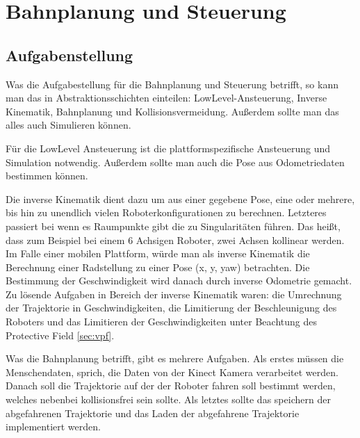\chapter{Bahnplanung und Steuerung}
\label{bahnplanung_steuerung_cha}

\section{Aufgabenstellung}
\label{bahnplanung_aufgabenstellung_sec}
\authorsection{\editoroier}


Was die Aufgabestellung für die Bahnplanung und Steuerung betrifft, so kann man das in Abstraktionsschichten einteilen:
LowLevel-Ansteuerung, Inverse Kinematik, Bahnplanung und Kollisionsvermeidung.
Außerdem sollte man das alles auch Simulieren können.

Für die LowLevel Ansteuerung ist die plattformspezifische Ansteuerung und Simulation notwendig. Außerdem sollte man auch die Pose aus Odometriedaten bestimmen können.

Die inverse Kinematik dient dazu um aus einer gegebene Pose, eine oder mehrere, bis hin zu unendlich vielen Roboterkonfigurationen zu berechnen. Letzteres passiert bei wenn es Raumpunkte gibt die zu Singularitäten führen. Das heißt,  dass zum Beispiel bei einem 6 Achsigen Roboter, zwei Achsen kollinear werden. Im Falle einer mobilen Plattform, würde man als inverse Kinematik die Berechnung einer Radstellung zu einer Pose (x, y, yaw) betrachten. Die Bestimmung der Geschwindigkeit wird danach durch inverse Odometrie gemacht. Zu lösende Aufgaben in Bereich der inverse Kinematik waren: die Umrechnung der Trajektorie in Geschwindigkeiten, die Limitierung der Beschleunigung des Roboters und das Limitieren der Geschwindigkeiten unter Beachtung des Protective Field \ref{sec:vpf}.

Was die Bahnplanung betrifft, gibt es mehrere Aufgaben. Als erstes müssen die Menschendaten, sprich, die Daten von der Kinect Kamera verarbeitet werden. Danach soll die Trajektorie auf der der Roboter fahren soll bestimmt werden, welches nebenbei kollisionsfrei sein sollte. Als letztes sollte das speichern der abgefahrenen Trajektorie und das Laden der abgefahrene Trajektorie implementiert werden.


